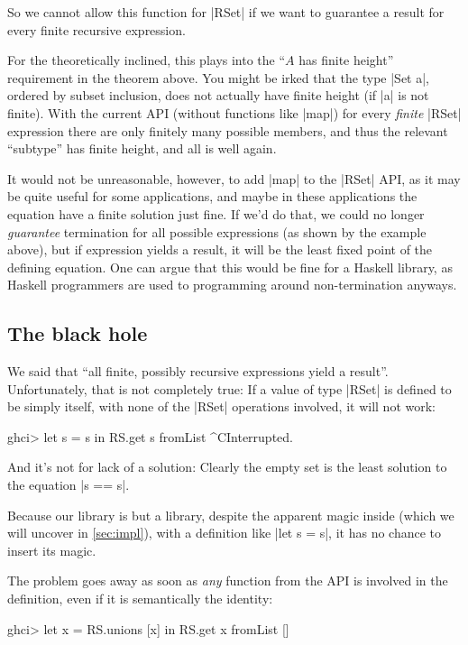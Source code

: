 \documentclass[manuscript,review,screen,acmsmall]{acmart}
\begin{document}
So we cannot allow this function for |RSet| if we want to guarantee a result for every finite recursive expression.

For the theoretically inclined, this plays into the “$A$ has finite height” requirement in the theorem above. You might be irked that the type |Set a|, ordered by subset inclusion, does not actually have finite height (if |a| is not finite). With the current API (without functions like |map|) for every \emph{finite} |RSet| expression there are only finitely many possible members, and thus the relevant “subtype” has finite height, and all is well again.

It would not be unreasonable, however, to add |map| to the |RSet| API, as it may be quite useful for some applications, and maybe in these applications the equation have a finite solution just fine. If we'd do that, we could no longer \emph{guarantee} termination for all possible expressions (as shown by the example above), but if expression yields a result, it will be the least fixed point of the defining equation. One can argue that this would be fine for a Haskell library, as Haskell programmers are used to programming around non-termination anyways.

\subsection{The black hole}\label{sec:blackhole}

We said that “all finite, possibly recursive expressions yield a result”. Unfortunately, that is not completely true: If a value of type |RSet| is defined to be simply itself, with none of the |RSet| operations involved, it will not work:
\begin{code}
ghci> let s = s in RS.get s
fromList ^CInterrupted.
\end{code}
And it’s not for lack of a solution: Clearly the empty set is the least solution to the equation |s == s|.

Because our library is but a library, despite the apparent magic inside (which we will uncover in \cref{sec:impl}), with a definition like |let s = s|, it has no chance to insert its magic.

The problem goes away as soon as \emph{any} function from the API is involved in the definition, even if it is semantically the identity:
\begin{code}
ghci> let x = RS.unions [x] in RS.get x
fromList []
\end{code}
\end{document}
